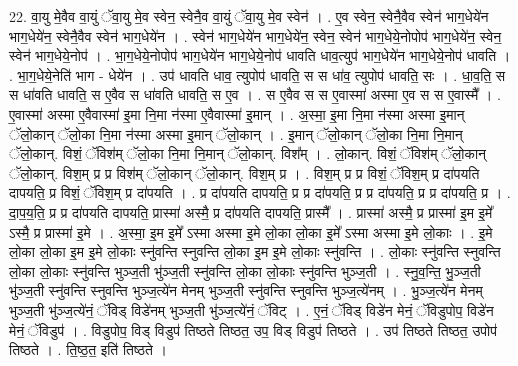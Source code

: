 \documentclass[17pt]{extarticle}
\begin{document}
22. वा॒यु मे॒वैव वा॒युं ॅवा॒यु मे॒व स्वेन॒ स्वेनै॒व वा॒युं ॅवा॒यु मे॒व स्वेन॑ । . ए॒व स्वेन॒ स्वेनै॒वैव स्वेन॑ भाग॒धेये॑न भाग॒धेये॑न॒ स्वेनै॒वैव स्वेन॑ भाग॒धेये॑न । . स्वेन॑ भाग॒धेये॑न भाग॒धेये॑न॒ स्वेन॒ स्वेन॑ भाग॒धेये॒नोपोप॑ भाग॒धेये॑न॒ स्वेन॒ स्वेन॑ भाग॒धेये॒नोप॑ । . भा॒ग॒धेये॒नोपोप॑ भाग॒धेये॑न भाग॒धेये॒नोप॑ धावति धाव॒त्युप॑ भाग॒धेये॑न भाग॒धेये॒नोप॑ धावति । . भा॒ग॒धेये॒नेति॑ भाग - धेये॑न । . उप॑ धावति धाव॒ त्युपोप॑ धावति॒ स स धा॑व॒ त्युपोप॑ धावति॒ सः । . धा॒व॒ति॒ स स धा॑वति धावति॒ स ए॒वैव स धा॑वति धावति॒ स ए॒व । . स ए॒वैव स स ए॒वास्मा॑ अस्मा ए॒व स स ए॒वास्मै᳚ । . ए॒वास्मा॑ अस्मा ए॒वैवास्मा॑ इ॒मा नि॒मा न॑स्मा ए॒वैवास्मा॑ इ॒मान् । . अ॒स्मा॒ इ॒मा नि॒मा न॑स्मा अस्मा इ॒मान् ॅलो॒कान् ॅलो॒का नि॒मा न॑स्मा अस्मा इ॒मान् ॅलो॒कान् । . इ॒मान् ॅलो॒कान् ॅलो॒का नि॒मा नि॒मान् ॅलो॒कान्. विशं॒ ॅविश॑म् ॅलो॒का नि॒मा नि॒मान् ॅलो॒कान्. विश᳚म् । . लो॒कान्. विशं॒ ॅविश॑म् ॅलो॒कान् ॅलो॒कान्. विश॒म् प्र प्र विश॑म् ॅलो॒कान् ॅलो॒कान्. विश॒म् प्र । . विश॒म् प्र प्र विशं॒ ॅविश॒म् प्र दा॑पयति दापयति॒ प्र विशं॒ ॅविश॒म् प्र दा॑पयति । . प्र दा॑पयति दापयति॒ प्र प्र दा॑पयति॒ प्र प्र दा॑पयति॒ प्र प्र दा॑पयति॒ प्र । . दा॒प॒य॒ति॒ प्र प्र दा॑पयति दापयति॒ प्रास्मा॑ अस्मै॒ प्र दा॑पयति दापयति॒ प्रास्मै᳚ । . प्रास्मा॑ अस्मै॒ प्र प्रास्मा॑ इ॒म इ॒मे᳚ ऽस्मै॒ प्र प्रास्मा॑ इ॒मे । . अ॒स्मा॒ इ॒म इ॒मे᳚ ऽस्मा अस्मा इ॒मे लो॒का लो॒का इ॒मे᳚ ऽस्मा अस्मा इ॒मे लो॒काः । . इ॒मे लो॒का लो॒का इ॒म इ॒मे लो॒काः स्नु॑वन्ति स्नुवन्ति लो॒का इ॒म इ॒मे लो॒काः स्नु॑वन्ति । . लो॒काः स्नु॑वन्ति स्नुवन्ति लो॒का लो॒काः स्नु॑वन्ति भुञ्ज॒ती भु॑ञ्ज॒ती स्नु॑वन्ति लो॒का लो॒काः स्नु॑वन्ति भुञ्ज॒ती । . स्नु॒व॒न्ति॒ भु॒ञ्ज॒ती भु॑ञ्ज॒ती स्नु॑वन्ति स्नुवन्ति भुञ्ज॒त्ये॑न मेनम् भुञ्ज॒ती स्नु॑वन्ति स्नुवन्ति भुञ्ज॒त्ये॑नम् । . भु॒ञ्ज॒त्ये॑न मेनम् भुञ्ज॒ती भु॑ञ्ज॒त्ये॑नं॒ ॅविड् विडे॑नम् भुञ्ज॒ती भु॑ञ्ज॒त्ये॑नं॒ ॅविट् । . ए॒नं॒ ॅविड् विडे॑न मेनं॒ ॅविडुपोप॒ विडे॑न मेनं॒ ॅविडुप॑ । . विडुपोप॒ विड् विडुप॑ तिष्ठते तिष्ठत॒ उप॒ विड् विडुप॑ तिष्ठते । . उप॑ तिष्ठते तिष्ठत॒ उपोप॑ तिष्ठते । . ति॒ष्ठ॒त॒ इति॑ तिष्ठते । \newline
\pagebreak
{}
\end{document}
